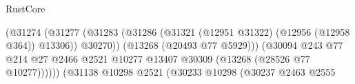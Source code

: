 \begin{lexlean}{RustCore}
\begin{coremodule}
                                                                        (@31274
                                                                          (@31277
                                                                            (@31283
                                                                              (@31286
                                                                                (@31321
                                                                                  (@12951 @31322)
                                                                                  (@12956
                                                                                    (@12958 @364))
                                                                                  @13306))
                                                                              @30270))
                                                                          (@13268
                                                                            (@20493 @77 @5929)))
                                                                        (@30094
                                                                          @243
                                                                          @77
                                                                          @214
                                                                          @27
                                                                          @2466
                                                                          @2521
                                                                          @10277
                                                                          @13407
                                                                          @30309
                                                                          (@13268
                                                                            (@28526 @77 @10277))))))
                                                                  (@31138
                                                                    @10298
                                                                    @2521
                                                                    (@30233
                                                                      @10298
                                                                      (@30237
                                                                        @2463
                                                                        @2555

\end{coremodule}
\end{lexlean}
